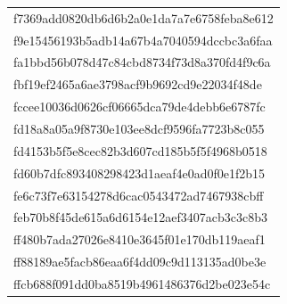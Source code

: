 \begin{tabular}{l}
f7369add0820db6d6b2a0e1da7a7e6758feba8e612 \\
f9e15456193b5adb14a67b4a7040594dccbc3a6faa \\
fa1bbd56b078d47c84cbd8734f73d8a370fd4f9c6a \\
fbf19ef2465a6ae3798acf9b9692cd9e22034f48de \\
fccee10036d0626cf06665dca79de4debb6e6787fc \\
fd18a8a05a9f8730e103ee8dcf9596fa7723b8c055 \\
fd4153b5f5e8cec82b3d607cd185b5f5f4968b0518 \\
fd60b7dfc893408298423d1aeaf4e0ad0f0e1f2b15 \\
fe6c73f7e63154278d6cac0543472ad7467938cbff \\
feb70b8f45de615a6d6154e12aef3407acb3c3c8b3 \\
ff480b7ada27026e8410e3645f01e170db119aeaf1 \\
ff88189ae5facb86eaa6f4dd09c9d113135ad0be3e \\
ffcb688f091dd0ba8519b4961486376d2be023e54c \\
\bottomrule
\end{tabular}
